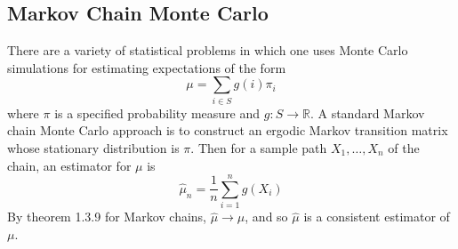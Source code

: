 \documentclass[twoside]{article}
\theoremstyle{definition}
\theoremstyle{remark}
\theoremstyle{remark}
\begin{document}
\subsection{Markov Chain Monte Carlo}
There are a variety of statistical problems in which one uses Monte Carlo
simulations for estimating expectations of the form
\begin{equation}
  \mu = \sum_{i \in S} g(i)\pi_i
\end{equation}
where $\pi$ is a specified probability measure and $g: S \rightarrow \mathbb{R}$.
A standard Markov chain Monte Carlo approach is to construct an ergodic Markov
transition matrix whose stationary distribution is $\pi$. Then for a sample path
$X_1, \ldots, X_n$ of the chain, an estimator for $\mu$ is
\begin{equation}
  \hat{\mu}_n = \frac{1}{n} \sum_{i=1}^{n}g(X_i)
\end{equation}
By theorem 1.3.9 for Markov chains, $\hat{\mu} \rightarrow \mu$, and so
$\hat{\mu}$ is a consistent estimator of $\mu$.

\clearpage
\printbibliography

\end{document}
